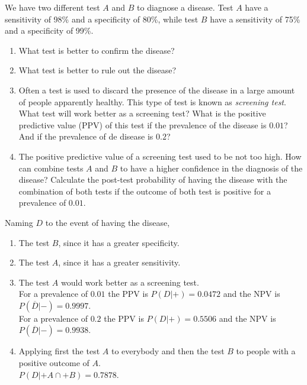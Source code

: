 {We have two different test $A$ and $B$ to diagnose a disease.
Test $A$ have a sensitivity of 98\% and a specificity of 80\%, while test $B$ have a sensitivity of 75\% and a
specificity of 99\%.
\begin{enumerate}
\item What test is better to confirm the disease?
\item What test is better to rule out the disease?
\item Often a test is used to discard the presence of the disease in a large amount of people apparently healthy.
This type of test is known as \emph{screening test}.
What test will work better as a screening test?
What is the positive predictive value (PPV) of this test if the prevalence of the disease is $0.01$? And if the
prevalence of de disease is $0.2$?
\item The positive predictive value of a screening test used to be not too high. 
How can combine tests $A$ and $B$ to have a higher confidence in the diagnosis of the disease?
Calculate the post-test probability of having the disease with the combination of both tests if the outcome of both test is positive for a prevalence of $0.01$.
\end{enumerate}
}
{Naming $D$ to the event of having the disease, 
\begin{enumerate}
\item The test $B$, since it has a greater specificity. 
\item The test $A$, since it has a greater sensitivity. 
\item The test $A$ would work better as a screening test.\\  
For a prevalence of $0.01$ the PPV is $P(D|+)=0.0472$ and the NPV is $P(\overline D|-)=0.9997$.\\
For a prevalence of $0.2$ the PPV is $P(D|+)=0.5506$ and the NPV is $P(\overline D|-)=0.9938$.
\item Applying first the test $A$ to everybody and then the test $B$ to people with a positive outcome of $A$.\\
$P(D|+A\cap +B)=0.7878$. 
\end{enumerate}
}
{}
